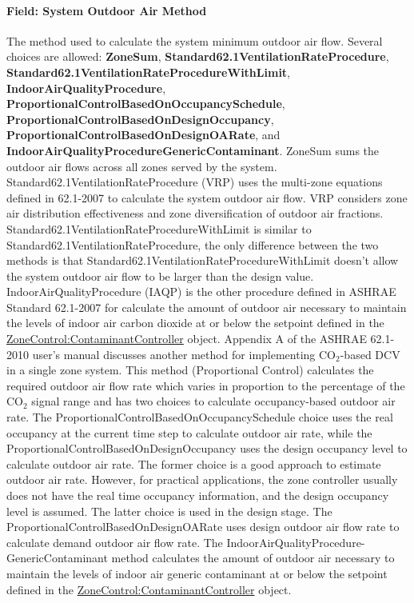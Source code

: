 \paragraph{Field: System Outdoor Air Method}\label{field-system-outdoor-air-method}

The method used to calculate the system minimum outdoor air flow. Several choices are allowed: \textbf{ZoneSum}, \textbf{Standard62.1VentilationRateProcedure}, \textbf{Standard62.1VentilationRateProcedureWithLimit}, \textbf{IndoorAirQualityProcedure}, \textbf{ProportionalControlBasedOnOccupancySchedule}, \textbf{ProportionalControlBasedOnDesignOccupancy}, \textbf{ProportionalControlBasedOnDesignOARate}, and \textbf{IndoorAirQualityProcedureGenericContaminant}. ZoneSum sums the outdoor air flows across all zones served by the system. Standard62.1VentilationRateProcedure (VRP) uses the multi-zone equations defined in 62.1-2007 to calculate the system outdoor air flow. VRP considers zone air distribution effectiveness and zone diversification of outdoor air fractions. Standard62.1VentilationRateProcedureWithLimit is similar to Standard62.1VentilationRateProcedure, the only difference between the two methods is that Standard62.1VentilationRateProcedureWithLimit doesn't allow the system outdoor air flow to be larger than the design value. IndoorAirQualityProcedure (IAQP) is the other procedure defined in ASHRAE Standard 62.1-2007 for calculate the amount of outdoor air necessary to maintain the levels of indoor air carbon dioxide at or below the setpoint defined in the \hyperref[zonecontrolcontaminantcontroller]{ZoneControl:ContaminantController} object. Appendix A of the ASHRAE 62.1-2010 user's manual discusses another method for implementing CO\(_{2}\)-based DCV in a single zone system. This method (Proportional Control) calculates the required outdoor air flow rate which varies in proportion to the percentage of the CO\(_{2}\) signal range and has two choices to calculate occupancy-based outdoor air rate. The ProportionalControlBasedOnOccupancySchedule choice uses the real occupancy at the current time step to calculate outdoor air rate, while the ProportionalControlBasedOnDesignOccupancy uses the design occupancy level to calculate outdoor air rate. The former choice is a good approach to estimate outdoor air rate. However, for practical applications, the zone controller usually does not have the real time occupancy information, and the design occupancy level is assumed. The latter choice is used in the design stage. The ProportionalControlBasedOnDesignOARate uses design outdoor air flow rate to calculate demand outdoor air flow rate. The IndoorAirQualityProcedure-GenericContaminant method calculates the amount of outdoor air necessary to maintain the levels of indoor air generic contaminant at or below the setpoint defined in the \hyperref[zonecontrolcontaminantcontroller]{ZoneControl:ContaminantController} object.


